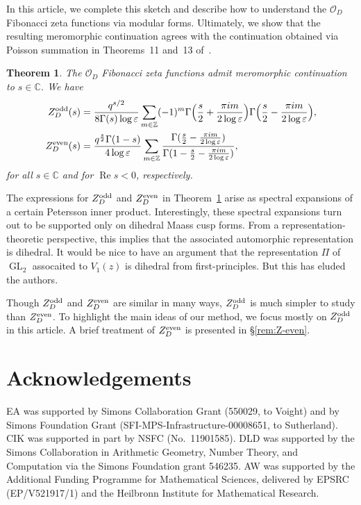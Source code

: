 \documentclass[11pt,reqno,oneside]{amsart}
\theoremstyle{plain}
\newtheorem{theorem}{Theorem}%
\theoremstyle{definition}
\renewcommand{\Re}{\operatorname{Re}}
\DeclareMathOperator{\GL}{GL}
\newcommand{\Zeven}{Z_D^{\textup{even}}}
\newcommand{\Zodd}{Z_D^{\textup{odd}}}
\begin{document}
In this article, we complete this sketch and describe how to understand the
$\mathcal{O}_D$ Fibonacci zeta functions via modular forms.
Ultimately, we show that the resulting meromorphic continuation agrees with the
continuation obtained via Poisson summation in Theorems~11 and~13 of~\cite{akldwFibonacciGeneral}.

\begin{theorem}\label{thm:main-theorem}
  The $\mathcal{O}_D$ Fibonacci zeta functions admit meromorphic continuation to $s \in \mathbb{C}$. We have
  \begin{align*}
    \Zodd(s) & =
    \frac{q^{s/2}}{8 \Gamma(s) \log \varepsilon}
    \sum_{m \in \mathbb{Z}} (-1)^m
    \Gamma\Big(\frac{s}{2} + \frac{\pi i m}{2\log \varepsilon}\Big)
    \Gamma\Big(\frac{s}{2} - \frac{\pi i m}{2\log \varepsilon}\Big), \\
    \Zeven(s)
             & =
    \frac{q^{\frac{s}{2}} \Gamma(1-s)}{4 \log \varepsilon} \sum_{m \in \mathbb{Z}}
    \frac{\Gamma(\frac{s}{2} - \frac{\pi i m}{2 \log \varepsilon})}
    {\Gamma(1-\frac{s}{2} - \frac{\pi i m}{2 \log \varepsilon})},
  \end{align*}
  for all $s \in \mathbb{C}$ and for $\Re s < 0$, respectively.
\end{theorem}

The expressions for $\Zodd$ and $\Zeven$ in Theorem~\ref{thm:main-theorem} arise as spectral expansions of a certain Petersson inner product.
Interestingly, these spectral expansions turn out to be supported only on dihedral Maass cusp forms.
From a representation-theoretic perspective, this implies that the associated
automorphic representation is dihedral.
It would be nice to have an argument that the representation $\Pi$ of $\GL_2$
assocaited to $V_1(z)$ is dihedral from first-principles.
But this has eluded the authors.

Though $\Zodd$ and $\Zeven$ are similar in many ways, $\Zodd$ is much simpler
to study than $\Zeven$. To highlight the main ideas of our method, we focus
mostly on $\Zodd$ in this article. A brief treatment of $\Zeven$ is presented
in \S\ref{rem:Z-even}.


\section*{Acknowledgements}

EA was supported by Simons Collaboration Grant (550029, to Voight) and
by Simons Foundation Grant (SFI-MPS-Infrastructure-00008651, to Sutherland).
CIK was supported in part by NSFC (No.\ 11901585).
DLD was supported by the Simons Collaboration in Arithmetic Geometry, Number
Theory, and Computation via the Simons Foundation grant 546235.
AW was supported by the Additional Funding Programme for Mathematical Sciences,
delivered by EPSRC (EP/V521917/1) and the Heilbronn Institute for Mathematical Research.
\end{document}
